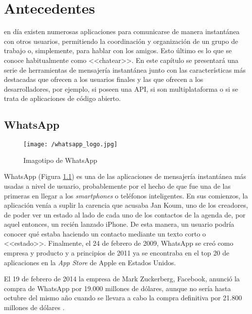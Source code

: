 \chapter{Antecedentes}
\label{chap:antecedentes}

 en día existen numerosas aplicaciones para comunicarse de manera instantánea con otros usuarios, permitiendo la coordinación y organización de un grupo de trabajo o, simplemente, para hablar con los amigos. Esto último es lo que se conoce habitualmente como <<chatear>>. En este capítulo se presentará una serie de herramientas de mensajería instantánea junto con las características más destacadas que ofrecen a los usuarios finales y las que ofrecen a los desarrolladores, por ejemplo, si poseen una \acf{API}, si son multiplataforma o si se trata de aplicaciones de código abierto.

\section{WhatsApp}
\label{sec:whatsapp}

\begin{figure}
	\begin{center}
		\texttt{[image: /whatsapp\_logo.jpg]}
		\caption{Imagotipo de WhatsApp}
		\label{fig:whatsapp}
	\end{center}
\end{figure}

WhatsApp (Figura \ref{fig:whatsapp}) es una de las aplicaciones de mensajería instantánea más usadas a nivel de usuario, probablemente por el hecho de que fue una de las primeras en llegar a los \textit{smartphones} o teléfonos inteligentes. En sus comienzos, la aplicación venía a suplir la carencia que acusaba Jan Koum, uno de los creadores, de poder ver un estado al lado de cada uno de los contactos de la agenda de, por aquel entonces, un recién lanzado iPhone. De esta manera, un usuario podría conocer qué estaba haciendo un contacto mediante un texto corto o <<estado>>. Finalmente, el 24 de febrero de 2009, WhatsApp se creó como empresa y producto y a principios de 2011 ya se encontraba en el top 20 de aplicaciones en la \textit{App Store} de Apple en Estados Unidos.

\newpage

El 19 de febrero de 2014 la empresa de Mark Zuckerberg, Facebook, anunció la compra de WhatsApp por 19.000 millones de dólares, aunque no sería hasta octubre del mismo año cuando se llevara a cabo la compra definitiva por 21.800 millones de dólares \cite{Novoa2014}.

